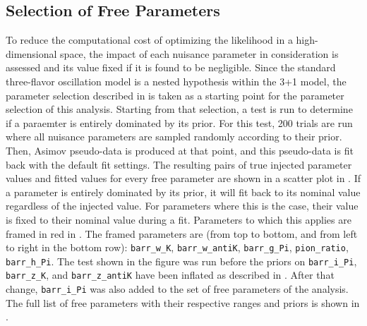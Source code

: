 \subsection{Selection of Free Parameters}
\label{sec:sterile-analysis-parameter-selection}
To reduce the computational cost of optimizing the likelihood in a high-dimensional space, the impact of each nuisance parameter in consideration is assessed and its value fixed if it is found to be negligible. Since the standard three-flavor oscillation model is a nested hypothesis within the 3+1 model, the parameter selection described in  is taken as a starting point for the parameter selection of this analysis.
Starting from that selection, a test is run to determine if a paraemter is entirely dominated by its prior. For this test, 200 trials are run where all nuisance parameters are sampled randomly according to their prior. Then,  Asimov pseudo-data is produced at that point, and this pseudo-data is fit back with the default fit settings. The resulting pairs of true injected parameter values and fitted values for every free parameter are shown in a scatter plot in . If a parameter is entirely dominated by its prior, it will fit back to its nominal value regardless of the injected value. For parameters where this is the case, their value is fixed to their nominal value during a fit. Parameters to which this applies are framed in red in . The framed parameters are (from top to bottom, and from left to right in the bottom row): \texttt{barr\_w\_K}, \texttt{barr\_w\_antiK}, \texttt{barr\_g\_Pi}, \texttt{pion\_ratio}, \texttt{barr\_h\_Pi}. The test shown in the figure was run before the priors on \texttt{barr\_i\_Pi}, \texttt{barr\_z\_K}, and \texttt{barr\_z\_antiK} have been inflated as described in . After that change,  \texttt{barr\_i\_Pi} was also added to the set of free parameters of the analysis. The full list of free parameters with their respective ranges and priors is shown in .

